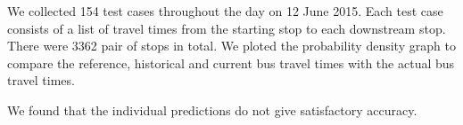 \par We collected 154 test cases throughout the day on 12 June 2015. Each test case consists of a list of travel times from the starting stop to each downstream stop. There were 3362 pair of stops in total. We ploted the probability density graph to compare the reference, historical and current bus travel times with the actual bus travel times.

\par We found that the individual predictions do not give satisfactory accuracy.




